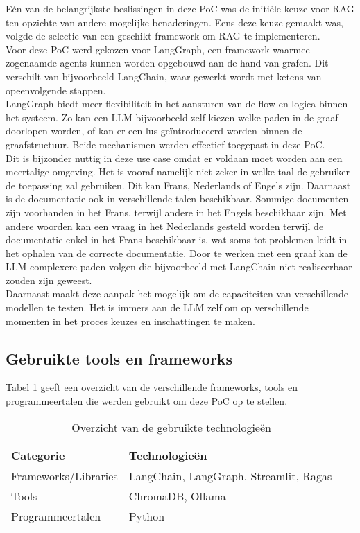 Eén van de belangrijkste beslissingen in deze PoC was de initiële keuze voor RAG ten opzichte van andere mogelijke benaderingen. Eens deze keuze gemaakt was, volgde de selectie van een geschikt framework om RAG te implementeren.
\\[1em]
Voor deze PoC werd gekozen voor LangGraph, een framework waarmee zogenaamde agents kunnen worden opgebouwd aan de hand van grafen. Dit verschilt van bijvoorbeeld LangChain, waar gewerkt wordt met ketens van opeenvolgende stappen.
\\[1em]
LangGraph biedt meer flexibiliteit in het aansturen van de flow en logica binnen het systeem. Zo kan een LLM bijvoorbeeld zelf kiezen welke paden in de graaf doorlopen worden, of kan er een lus geïntroduceerd worden binnen de graafstructuur. Beide mechanismen werden effectief toegepast in deze PoC.
\\[1em]
Dit is bijzonder nuttig in deze use case omdat er voldaan moet worden aan een meertalige omgeving. Het is vooraf namelijk niet zeker in welke taal de gebruiker de toepassing zal gebruiken. Dit kan Frans, Nederlands of Engels zijn. Daarnaast is de documentatie ook in verschillende talen beschikbaar. Sommige documenten zijn voorhanden in het Frans, terwijl andere in het Engels beschikbaar zijn. Met andere woorden kan een vraag in het Nederlands gesteld worden terwijl de documentatie enkel in het Frans beschikbaar is, wat soms tot problemen leidt in het ophalen van de correcte documentatie. Door te werken met een graaf kan de LLM complexere paden volgen die bijvoorbeeld met LangChain niet realiseerbaar zouden zijn geweest.
\\[1em]
Daarnaast maakt deze aanpak het mogelijk om de capaciteiten van verschillende modellen te testen. Het is immers aan de LLM zelf om op verschillende momenten in het proces keuzes en inschattingen te maken.

\subsection{Gebruikte tools en frameworks}
Tabel \ref{tab:gebruikte_technologieen} geeft een overzicht van de verschillende frameworks, tools en programmeertalen die werden gebruikt om deze PoC op te stellen.

\begin{table}[H]
    \begin{tabular}{|l|l|}
        \hline
        \textbf{Categorie}       & \textbf{Technologieën}               \\ \hline
        Frameworks/Libraries     & LangChain, LangGraph, Streamlit, Ragas \\ \hline
        Tools                   & ChromaDB, Ollama                    \\ \hline
        Programmeertalen        & Python                             \\ \hline
    \end{tabular}
    \caption{Overzicht van de gebruikte technologieën}
    \label{tab:gebruikte_technologieen}
\end{table}

